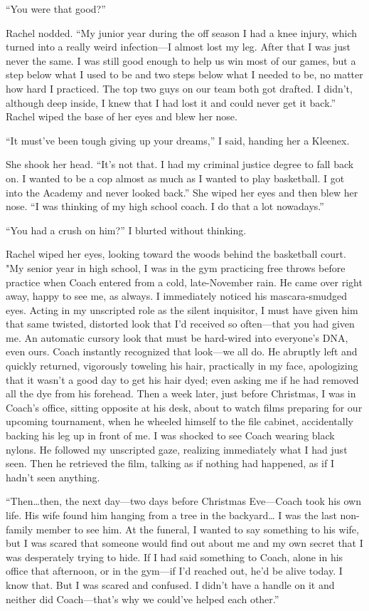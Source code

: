 ``You were that good?''

Rachel nodded. ``My junior year during the off season I had a knee
injury, which turned into a really weird infection---I almost lost my
leg. After that I was just never the same. I was still good enough to
help us win most of our games, but a step below what I used to be and
two steps below what I needed to be, no matter how hard I practiced. The
top two guys on our team both got drafted. I didn't, although deep
inside, I knew that I had lost it and could never get it back.'' Rachel
wiped the base of her eyes and blew her nose.

``It must've been tough giving up your dreams,'' I said, handing her a
Kleenex.

She shook her head. ``It's not that. I had my criminal justice degree to
fall back on. I wanted to be a cop almost as much as I wanted to play
basketball. I got into the Academy and never looked back.'' She wiped
her eyes and then blew her nose. ``I was thinking of my high school
coach. I do that a lot nowadays.''

``You had a crush on him?'' I blurted without thinking.

Rachel wiped her eyes, looking toward the woods behind the basketball
court. "My senior year in high school, I was in the gym practicing free
throws before practice when Coach entered from a cold, late-November
rain. He came over right away, happy to see me, as always. I immediately
noticed his mascara-smudged eyes. Acting in my unscripted role as the
silent inquisitor, I must have given him that same twisted, distorted
look that I'd received so often---that you had given me. An automatic
cursory look that must be hard-wired into everyone's DNA, even ours.
Coach instantly recognized that look---we all do. He abruptly left and
quickly returned, vigorously toweling his hair, practically in my face,
apologizing that it wasn't a good day to get his hair dyed; even asking
me if he had removed all the dye from his forehead. Then a week later,
just before Christmas, I was in Coach's office, sitting opposite at his
desk, about to watch films preparing for our upcoming tournament, when
he wheeled himself to the file cabinet, accidentally backing his leg up
in front of me. I was shocked to see Coach wearing black nylons. He
followed my unscripted gaze, realizing immediately what I had just seen.
Then he retrieved the film, talking as if nothing had happened, as if I
hadn't seen anything.

``Then\ldots then, the next day---two days before Christmas Eve---Coach
took his own life. His wife found him hanging from a tree in the
backyard\ldots{} I was the last non-family member to see him. At the
funeral, I wanted to say something to his wife, but I was scared that
someone would find out about me and my own secret that I was desperately
trying to hide. If I had said something to Coach, alone in his office
that afternoon, or in the gym---if I'd reached out, he'd be alive today.
I know that. But I was scared and confused. I didn't have a handle on it
and neither did Coach---that's why we could've helped each other.''


